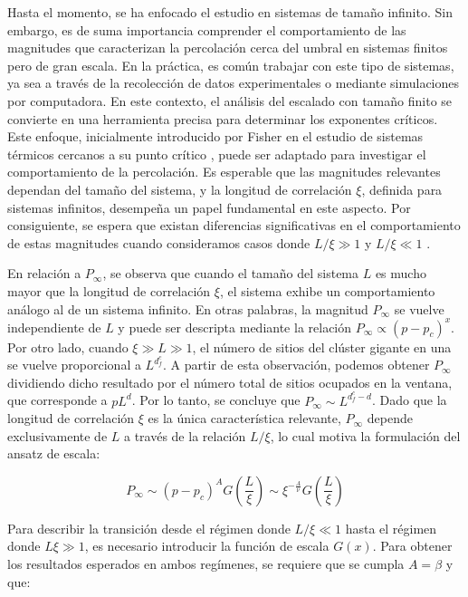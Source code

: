 Hasta el momento, se ha enfocado el estudio en sistemas de tamaño infinito. Sin embargo, es de suma importancia comprender el comportamiento de las magnitudes que caracterizan la percolación cerca del umbral en sistemas finitos pero de gran escala. En la práctica, es común trabajar con este tipo de sistemas, ya sea a través de la recolección de datos experimentales o mediante simulaciones por computadora. En este contexto, el análisis del escalado con tamaño finito se convierte en una herramienta precisa para determinar los exponentes críticos. Este enfoque, inicialmente introducido por Fisher en el estudio de sistemas térmicos cercanos a su punto crítico \cite{Fisher_critical}, puede ser adaptado para investigar el comportamiento de la percolación. Es esperable que las magnitudes relevantes dependan del tamaño del sistema, y la longitud de correlación $\xi$, definida para sistemas infinitos, desempeña un papel fundamental en este aspecto. Por consiguiente, se espera que existan diferencias significativas en el comportamiento de estas magnitudes cuando consideramos casos donde $L/\xi\gg1$ y $L/\xi \ll 1$ \cite{bunde_fractals_2012}.


En relación a $P_\infty$, se observa que cuando el tamaño del sistema $L$ es mucho mayor que la longitud de correlación $\xi$, el sistema exhibe un comportamiento análogo al de un sistema infinito. En otras palabras, la magnitud $P_\infty$ se vuelve independiente de $L$ y puede ser descripta mediante la relación $P_\infty \propto (p - p_c)^{x}$. Por otro lado, cuando $\xi\gg L\gg1$, el número de sitios del clúster gigante en una  se vuelve proporcional a $L^{d_f^c}$. A partir de esta observación, podemos obtener $P_\infty$ dividiendo dicho resultado por el número total de sitios ocupados en la ventana, que corresponde a $pL^d$. Por lo tanto, se concluye que $P_\infty\sim L^{d_f^c-d}$. Dado que la longitud de correlación $\xi$ es la única característica relevante, $P_\infty$ depende exclusivamente de $L$ a través de la relación $L/\xi$, lo cual motiva la formulación del \gls{ansatz} de escala:

\begin{equation}\label{eq:30}
P_\infty\sim \left(p-p_c\right)^AG\left(\frac{L}{\xi}\right)\sim \xi^{-\frac{A}{\nu}}G\left(\frac{L}{\xi}\right)
\end{equation}

Para describir la transición desde el régimen donde $L/\xi\ll1$ hasta el régimen donde $L\xi\gg 1$, es necesario introducir la función de escala $G(x)$. Para obtener los resultados esperados en ambos regímenes, se requiere que se cumpla $A = \beta$  y que:

